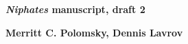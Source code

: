 \documentclass[../main.tex]{subfiles}
\begin{document}
\begin{titlepage}
   \begin{center}
       \vspace*{1cm}
        \huge
       \textbf{\emph{Niphates} manuscript, draft 2}
       \vspace{2.0cm}
       
       \large
       \textbf{Merritt C. Polomsky, Dennis Lavrov}
       \vfill
       \vspace{0.8cm}
   \end{center}
\end{titlepage}
\end{document}
